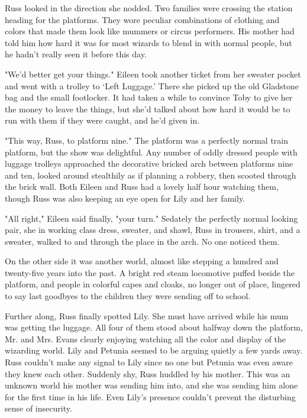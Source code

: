 Russ looked in the direction she nodded. Two families were crossing the station heading for the platforms. They wore peculiar combinations of clothing and colors that made them look like mummers or circus performers. His mother had told him how hard it was for most wizards to blend in with normal people, but he hadn't really seen it before this day.

"We'd better get your things." Eileen took another ticket from her sweater pocket and went with a trolley to `Left Luggage.' There she picked up the old Gladstone bag and the small footlocker. It had taken a while to convince Toby to give her the money to leave the things, but she'd talked about how hard it would be to run with them if they were caught, and he'd given in.

"This way, Russ, to platform nine." The platform was a perfectly normal train platform, but the show was delightful. Any number of oddly dressed people with luggage trolleys approached the decorative bricked arch between platforms nine and ten, looked around stealthily as if planning a robbery, then scooted through the brick wall. Both Eileen and Russ had a lovely half hour watching them, though Russ was also keeping an eye open for Lily and her family.

"All right," Eileen said finally, "your turn." Sedately the perfectly normal looking pair, she in working class dress, sweater, and shawl, Russ in trousers, shirt, and a sweater, walked to and through the place in the arch. No one noticed them.

On the other side it was another world, almost like stepping a hundred and twenty-five years into the past. A bright red steam locomotive puffed beside the platform, and people in colorful capes and cloaks, no longer out of place, lingered to say last goodbyes to the children they were sending off to school.

Further along, Russ finally spotted Lily. She must have arrived while his mum was getting the luggage. All four of them stood about halfway down the platform, Mr. and Mrs. Evans clearly enjoying watching all the color and display of the wizarding world. Lily and Petunia seemed to be arguing quietly a few yards away. Russ couldn't make any signal to Lily since no one but Petunia was even aware they knew each other. Suddenly shy, Russ huddled by his mother. This was an unknown world his mother was sending him into, and she was sending him alone for the first time in his life. Even Lily's presence couldn't prevent the disturbing sense of insecurity.

